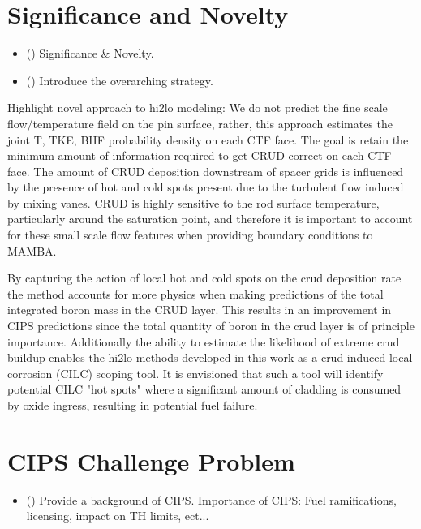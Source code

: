 \section{Significance and Novelty}

\begin{itemize}
    \item (\checkmark) Significance \& Novelty.
    \item (\checkmark) Introduce the overarching strategy.
\end{itemize}

Highlight novel approach to hi2lo modeling:  We do not predict the fine scale flow/temperature field on the pin surface, rather, this approach estimates the joint T, TKE, BHF probability density on each CTF face.  The goal is retain the minimum amount of information required to get CRUD correct on each CTF face.  The amount of CRUD deposition downstream of spacer grids is influenced by the presence of hot and cold spots present due to the turbulent flow induced by mixing vanes.  CRUD is highly sensitive to the rod surface temperature, particularly around the saturation point, and therefore it is important to account for these small scale flow features when providing boundary conditions to MAMBA.

By capturing the action of local hot and cold spots on the crud deposition rate the method accounts for more physics when making predictions of the total integrated boron mass in the CRUD layer.  This results in an improvement in CIPS predictions since the total quantity of boron in the crud layer is of principle importance.  Additionally the ability to estimate the likelihood of extreme crud buildup enables the hi2lo methods developed in this work as a crud induced local corrosion (CILC) scoping tool.  It is envisioned that such a tool will identify potential CILC "hot spots" where a significant amount of cladding is consumed by oxide ingress, resulting in potential fuel failure.


\section{CIPS Challenge Problem}

\begin{itemize}
    \item (\checkmark) Provide a background of CIPS.  Importance of CIPS:  Fuel ramifications, licensing, impact on TH limits, ect...
\end{itemize}


